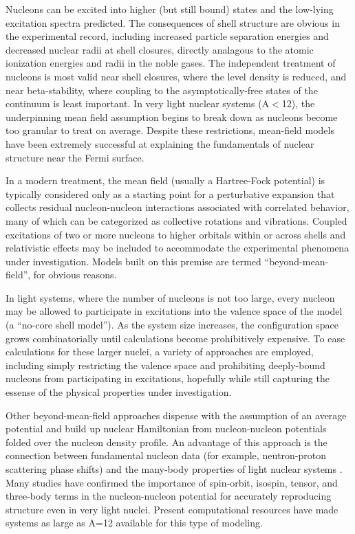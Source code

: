 Nucleons can be
excited into higher (but still bound) states and the low-lying excitation
spectra predicted. The consequences of shell structure are obvious
in the experimental record, including increased particle separation 
energies and decreased nuclear radii at shell closures, directly analagous to
the atomic ionization energies and radii in the noble gases. The independent
treatment of nucleons is most valid near shell closures,
where the level density is reduced, and near beta-stability, where coupling to
the asymptotically-free states of the continuum is least important. In very light nuclear
systems (A$<$12), the underpinning mean field assumption begins to break down as
nucleons become too granular to treat on average. Despite these restrictions, mean-field models have
been extremely successful at explaining the fundamentals of nuclear structure near the Fermi
surface.

In a modern treatment, the mean field (usually a Hartree-Fock potential)
is typically considered only as a starting point for a perturbative
expansion that collects residual nucleon-nucleon interactions associated with
correlated behavior, many of which can be categorized as collective rotations
and vibrations. Coupled excitations of
two or more nucleons to higher orbitals within or across shells and relativistic effects may 
be included to accommodate the experimental phenomena under investigation.
Models built on this premise are termed ``beyond-mean-field'', for obvious reasons.

In light systems, where the number of nucleons is not too large, every nucleon
may be allowed to participate in excitations into the valence space of the model
(a ``no-core shell model''). As the system size increases, the configuration space grows
combinatorially until calculations become prohibitively expensive. To ease calculations for these 
larger nuclei, a variety of approaches
are employed, including simply restricting the valence space and prohibiting deeply-bound 
nucleons from participating in excitations, hopefully while still capturing the
essense of the physical properties under investigation.


Other beyond-mean-field approaches dispense with the assumption of an average
potential and build up nuclear Hamiltonian from nucleon-nucleon potentials
folded over the nucleon density profile. An advantage
of this approach is the connection between fundamental nucleon data
(for example, neutron-proton scattering phase shifts) and the many-body
properties of light nuclear systems \cite{AV18}. Many studies have
confirmed the importance of spin-orbit, isospin, tensor, and three-body terms
in the nucleon-nucleon potential for accurately reproducing structure even in
very light nuclei. Present computational resources have made systems as large as A=12 available for
this type of modeling.

